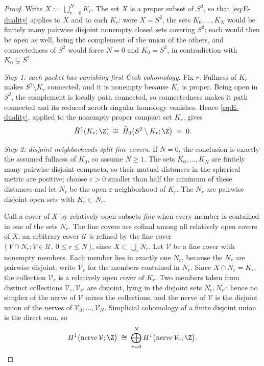 \begin{proof}
Write $X:=\bigcup_{r=0}^{N}K_r$.  The set $X$ is a proper subset of
$S^2$, so that \eqref{eq:E-duality} applies to $X$ and to each $K_r$: were $X=S^2$,
the sets $K_0,\dots,K_N$ would be finitely many pairwise disjoint nonempty closed
sets covering $S^2$; each would then be open as well, being the complement of the
union of the others, and connectedness of $S^2$ would force $N=0$ and $K_0=S^2$, in
contradiction with $K_0\subsetneq S^2$.

\emph{Step 1: each packet has vanishing first \v{C}ech cohomology.}
Fix $r$. Fullness of $K_r$ makes $S^2\setminus K_r$ connected, and it is nonempty
because $K_r$ is proper. Being open in $S^2$, the complement is locally path
connected, so connectedness makes it path connected and its reduced zeroth singular
homology vanishes. Hence \eqref{eq:E-duality}, applied to the nonempty proper
compact set $K_r$, gives
\[
\check H^1(K_r;\Z)\;\cong\;\widetilde H_0\bigl(S^2\setminus K_r;\Z\bigr)\;=\;0 .
\]

\emph{Step 2: disjoint neighborhoods split fine covers.}
If $N=0$, the conclusion is exactly the assumed fullness of $K_0$, so
assume $N\ge1$.
The sets $K_0,\dots,K_N$ are finitely many pairwise disjoint compacta, so their
mutual distances in the spherical metric are positive; choose $\varepsilon>0$ smaller
than half the minimum of these distances and let $N_r$ be the open
$\varepsilon$-neighborhood of $K_r$. The $N_r$ are pairwise disjoint open sets with
$K_r\subset N_r$.

Call a cover of $X$ by relatively open subsets \emph{fine} when every member is
contained in one of the sets $N_r$. The fine covers are cofinal among all relatively
open covers of $X$: an arbitrary cover $\mathcal U$ is refined by the fine cover
$\{\,V\cap N_r : V\in\mathcal U,\ 0\le r\le N\,\}$, since
$X\subset\bigcup_rN_r$. Let $\mathcal V$ be a fine cover with nonempty members. Each
member lies in exactly one $N_r$, because the $N_r$ are pairwise disjoint; write
$\mathcal V_r$ for the members contained in $N_r$. Since
$X\cap N_r=K_r$, the collection $\mathcal V_r$ is a relatively open cover of $K_r$.
Two members taken from distinct collections $\mathcal V_r,\mathcal V_{r'}$ are
disjoint, lying in the disjoint sets $N_r,N_{r'}$; hence no simplex of the nerve of
$\mathcal V$ mixes the collections, and the nerve of $\mathcal V$ is the disjoint
union of the nerves of $\mathcal V_0,\dots,\mathcal V_N$. Simplicial cohomology of a
finite disjoint union is the direct sum, so
\[
H^1\bigl(\mathrm{nerve}\,\mathcal V;\Z\bigr)\;\cong\;
\bigoplus_{r=0}^{N}H^1\bigl(\mathrm{nerve}\,\mathcal V_r;\Z\bigr).
\]


\end{proof}

